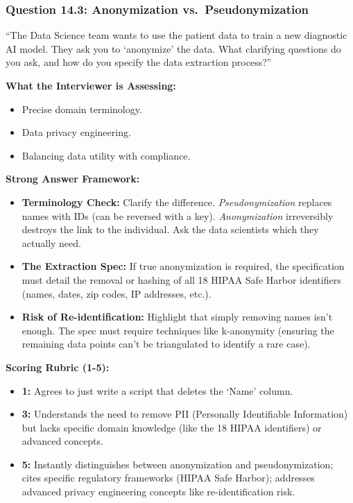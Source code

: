 \documentclass[
  11pt,
  openany,
  oneside]{book}
\providecommand{\tightlist}{%
  \setlength{\itemsep}{0pt}\setlength{\parskip}{0pt}}
\begin{document}
\subsubsection{Question 14.3: Anonymization
vs.~Pseudonymization}\label{question-14.3-anonymization-vs.-pseudonymization}

``The Data Science team wants to use the patient data to train a new
diagnostic AI model. They ask you to `anonymize' the data. What
clarifying questions do you ask, and how do you specify the data
extraction process?''

\textbf{What the Interviewer is Assessing:}

\begin{itemize}
\tightlist
\item
  Precise domain terminology.
\item
  Data privacy engineering.
\item
  Balancing data utility with compliance.
\end{itemize}

\textbf{Strong Answer Framework:}

\begin{itemize}
\tightlist
\item
  \textbf{Terminology Check:} Clarify the difference.
  \emph{Pseudonymization} replaces names with IDs (can be reversed with
  a key). \emph{Anonymization} irreversibly destroys the link to the
  individual. Ask the data scientists which they actually need.
\item
  \textbf{The Extraction Spec:} If true anonymization is required, the
  specification must detail the removal or hashing of all 18 HIPAA Safe
  Harbor identifiers (names, dates, zip codes, IP addresses, etc.).
\item
  \textbf{Risk of Re-identification:} Highlight that simply removing
  names isn't enough. The spec must require techniques like k-anonymity
  (ensuring the remaining data points can't be triangulated to identify
  a rare case).
\end{itemize}

\textbf{Scoring Rubric (1-5):}

\begin{itemize}
\tightlist
\item
  \textbf{1:} Agrees to just write a script that deletes the `Name'
  column.
\item
  \textbf{3:} Understands the need to remove PII (Personally
  Identifiable Information) but lacks specific domain knowledge (like
  the 18 HIPAA identifiers) or advanced concepts.
\item
  \textbf{5:} Instantly distinguishes between anonymization and
  pseudonymization; cites specific regulatory frameworks (HIPAA Safe
  Harbor); addresses advanced privacy engineering concepts like
  re-identification risk.
\end{itemize}
\end{document}
